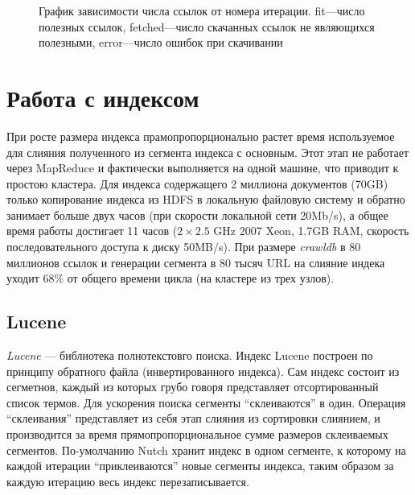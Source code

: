 \begin{figure}[h!]
 \caption{График зависимости числа ссылок от номера итерации. fit---число полезных ссылок, fetched---число скачанных ссылок не являющихся полезными, error---число ошибок при скачивании}
 \label{ris:score}
\end{figure}

\section{Работа с индексом}
При росте размера индекса прамопропорционально растет время используемое для слияния полученного из сегмента индекса с основным. Этот этап не работает через MapReduce и фактически выполняется на одной машине, что приводит к простою кластера. Для индекса содержащего 2 миллиона документов (70GB) только копирование индекса из HDFS в локальную файловую систему и обратно занимает больше двух часов (при скорости локальной сети 20Mb/s), а общее время работы достигает 11 часов ($2\times2.5$ GHz 2007 Xeon, 1.7GB RAM, скорость последовательного доступа к диску 50MB/s). При размере \textit{crawldb} в 80 миллионов ссылок и генерации сегмента в 80 тысяч URL на слияние индека уходит 68\% от общего времени цикла (на кластере из трех узлов).
\subsection{Lucene}
\textit{Lucene} --- библиотека полнотекстовго поиска. Индекс Lucene построен по принципу обратного файла (инвертированного индекса). Сам индекс состоит из сегметнов, каждый из которых грубо говоря представляет отсортированный список термов. Для ускорения поиска сегменты ``склеиваются'' в один. Операция ``склеивания'' представляет из себя этап слияния из сортировки слиянием, и производится за время прямопропорциональное сумме размеров склеиваемых сегментов. По-умолчанию Nutch хранит индекс в одном сегменте, к которому на каждой итерации ``приклеиваются'' новые сегменты индекса, таким образом за каждую итерацию весь индекс перезаписывается.

